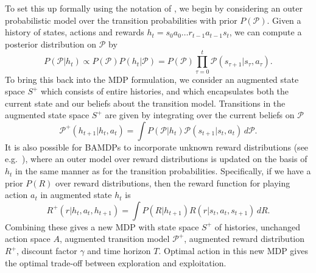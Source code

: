 \documentclass[a4paper, 10pt]{report}
\theoremstyle{plain}
\begin{document}
	To set this up formally using the notation of \citet{guez2012efficient}, we begin by considering an outer probabilistic model over the transition probabilities with prior $P(\mathcal{P})$.
	Given a history of states, actions and rewards $h_t = s_0a_0\dots r_{t-1}a_{t-1}s_t$, we can compute a posterior distribution on $\mathcal{P}$ by
	\begin{equation}
	P(\mathcal{P}|h_t) \propto P(\mathcal{P})P(h_t|\mathcal{P}) = P(\mathcal{P}) \prod_{\tau=0}^t \mathcal{P}(s_{\tau+1}|s_\tau,a_\tau).
	\end{equation}
	To bring this back into the MDP formulation, we consider an augmented state space $S^+$ which consists of entire histories, and which encapsulates both the current state and our beliefs about the transition model.
	Transitions in the augmented state space $S^+$ are given by integrating over the current beliefs on $\mathcal{P}$
	\begin{equation}
	\label{eq:augmentedtransition}
	\mathcal{P}^+(h_{t+1}|h_t,a_t) = \int P(\mathcal{P}|h_t)\mathcal{P}(s_{t+1}|s_t,a_t) \, d\mathcal{P}.
	\end{equation}
	It is also possible for BAMDPs to incorporate unknown reward distributions (see e.g.~\citet{zintgraf2019varibad}), where an outer model over reward distributions is updated on the basis of $h_t$ in the same manner as for the transition probabilities. Specifically, if we have a prior $P(R)$ over reward distributions, then the reward function for playing action $a_t$ in augmented state $h_t$ is
	\begin{equation}
	R^+(r|h_t,a_t,h_{t+1}) = \int P(R|h_{t+1})R(r|s_t,a_t,s_{t+1}) \, dR.
	\end{equation}
	Combining these gives a new MDP with state space $S^+$ of histories, unchanged action space $A$, augmented transition model $\mathcal{P}^+$, augmented reward distribution $R^+$, discount factor $\gamma$ and time horizon $T$.
	Optimal action in this new MDP gives the optimal trade-off between exploration and exploitation.
	
\end{document}
